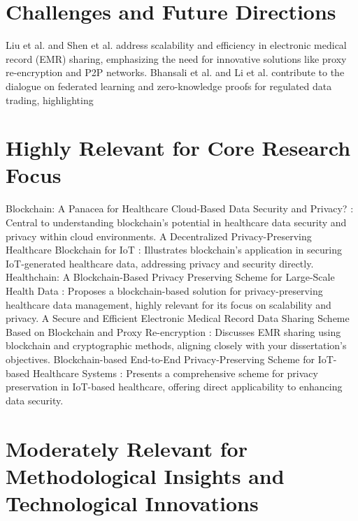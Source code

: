 \documentclass[cic,tc,english]{iiufrgs}
\begin{document}
\section{Challenges and Future Directions}
Liu et al. \cite{Liu2024} and Shen et al. \cite{Shen2019} address scalability and efficiency in electronic medical record (EMR) sharing, emphasizing the need for innovative solutions like proxy re-encryption and P2P networks. Bhansali et al. \cite{Bhansali2022} and Li et al. \cite{Li2024} contribute to the dialogue on federated learning and zero-knowledge proofs for regulated data trading, highlighting 

\section{Highly Relevant for Core Research Focus}

    Blockchain: A Panacea for Healthcare Cloud-Based Data Security and Privacy? \cite{Esposito2018}: Central to understanding blockchain's potential in healthcare data security and privacy within cloud environments.
    A Decentralized Privacy-Preserving Healthcare Blockchain for IoT \cite{Dwivedi2019}: Illustrates blockchain's application in securing IoT-generated healthcare data, addressing privacy and security directly.
    Healthchain: A Blockchain-Based Privacy Preserving Scheme for Large-Scale Health Data \cite{XuJie2019}: Proposes a blockchain-based solution for privacy-preserving healthcare data management, highly relevant for its focus on scalability and privacy.
    A Secure and Efficient Electronic Medical Record Data Sharing Scheme Based on Blockchain and Proxy Re-encryption \cite{Liu2024}: Discusses EMR sharing using blockchain and cryptographic methods, aligning closely with your dissertation’s objectives.
    Blockchain-based End-to-End Privacy-Preserving Scheme for IoT-based Healthcare Systems \cite{maryam2024}: Presents a comprehensive scheme for privacy preservation in IoT-based healthcare, offering direct applicability to enhancing data security.

\section{Moderately Relevant for Methodological Insights and Technological Innovations}
\end{document}
